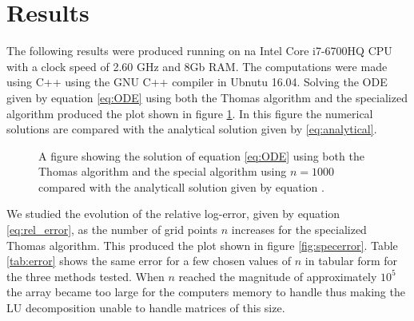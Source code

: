 \documentclass[twocolumn]{aastex62}
\begin{document}
\section{Results} \label{sec:results}
The following results were produced running on na Intel Core i7-6700HQ CPU with a clock speed of 2.60 GHz and 8Gb RAM. The computations were made using C++ using the GNU C++ compiler in Ubnutu 16.04. Solving  the ODE given by equation \ref{eq:ODE} using both the Thomas algorithm and the specialized algorithm produced the plot shown in figure \ref{fig:solution}.  In this figure the numerical solutions are compared with the analytical solution given by \ref{eq:analytical}.
\begin{figure}[ht]
	\caption{A figure showing the solution of equation \ref{eq:ODE} using both the Thomas algorithm and the special algorithm using $n=1000$ compared with the analyticall solution given by equation .}
	\label{fig:solution}
\end{figure}

We studied the evolution of the relative log-error, given by equation \ref{eq:rel_error}, as the number of grid points $n$ increases for the specialized Thomas algorithm. This produced the plot shown in figure \ref{fig:specerror}. Table \ref{tab:error} shows the same error for a few chosen values of $n$ in tabular form for the three methods tested. When $n$ reached the magnitude of approximately $10^5$ the array became too large for the computers memory to handle thus making the LU decomposition unable to handle matrices of this size.

\end{document}
